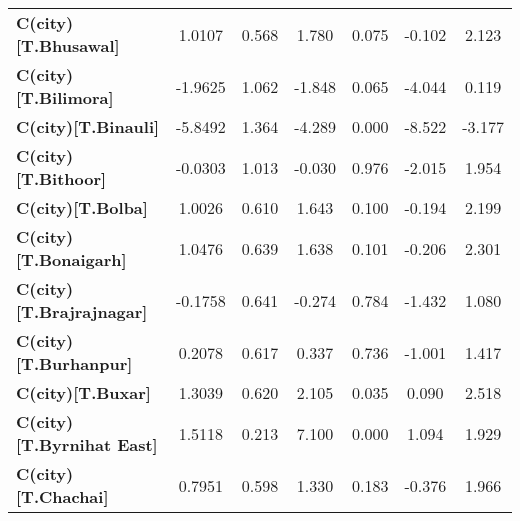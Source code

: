 \begin{center}
\begin{tabular}{lcccccc}
\textbf{C(city)[T.Bhusawal]}                                                                        &       1.0107  &        0.568     &     1.780  &         0.075        &       -0.102    &        2.123     \\
\textbf{C(city)[T.Bilimora]}                                                                        &      -1.9625  &        1.062     &    -1.848  &         0.065        &       -4.044    &        0.119     \\
\textbf{C(city)[T.Binauli]}                                                                         &      -5.8492  &        1.364     &    -4.289  &         0.000        &       -8.522    &       -3.177     \\
\textbf{C(city)[T.Bithoor]}                                                                         &      -0.0303  &        1.013     &    -0.030  &         0.976        &       -2.015    &        1.954     \\
\textbf{C(city)[T.Bolba]}                                                                           &       1.0026  &        0.610     &     1.643  &         0.100        &       -0.194    &        2.199     \\
\textbf{C(city)[T.Bonaigarh]}                                                                       &       1.0476  &        0.639     &     1.638  &         0.101        &       -0.206    &        2.301     \\
\textbf{C(city)[T.Brajrajnagar]}                                                                    &      -0.1758  &        0.641     &    -0.274  &         0.784        &       -1.432    &        1.080     \\
\textbf{C(city)[T.Burhanpur]}                                                                       &       0.2078  &        0.617     &     0.337  &         0.736        &       -1.001    &        1.417     \\
\textbf{C(city)[T.Buxar]}                                                                           &       1.3039  &        0.620     &     2.105  &         0.035        &        0.090    &        2.518     \\
\textbf{C(city)[T.Byrnihat East]}                                                                   &       1.5118  &        0.213     &     7.100  &         0.000        &        1.094    &        1.929     \\
\textbf{C(city)[T.Chachai]}                                                                         &       0.7951  &        0.598     &     1.330  &         0.183        &       -0.376    &        1.966     \\

\end{tabular}
\end{center}
